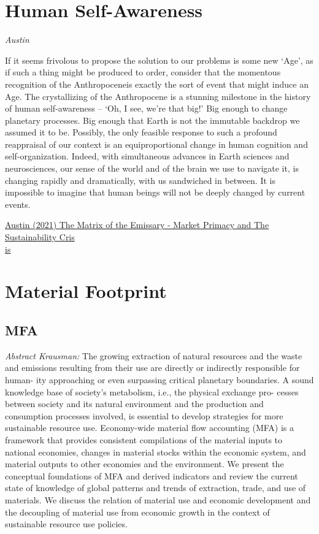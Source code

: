 \documentclass[
]{book}
\begin{document}
\hypertarget{human-self-awareness}{%
\section{Human Self-Awareness}\label{human-self-awareness}}

\emph{Austin}

If it seems frivolous to propose the solution to our problems is some new `Age', as if such a thing might be produced to order, consider that the momentous recognition of the Anthropoceneis exactly the sort of event that might induce an Age. The crystallizing of the Anthropocene is a stunning milestone in the history of human self-awareness -- `Oh, I see, we're that big!' Big enough to change planetary processes. Big enough that Earth is not the immutable backdrop we assumed it to be. Possibly, the only feasible response to such a profound reappraisal of our context is an equiproportional change in human cognition and self-organization. Indeed, with simultaneous advances in Earth sciences and neurosciences, our sense of the world and of the brain we use to navigate it, is changing rapidly and dramatically, with us sandwiched in between. It is impossible to imagine that human beings will not be deeply changed by current events.

\href{https://channelmcgilchrist.com/articles/the-matrix-of-the-emissary/}{Austin (2021) The Matrix of the Emissary - Market Primacy and The Sustainability Cris\\
is}

\hypertarget{material-footprint}{%
\section{Material Footprint}\label{material-footprint}}

\hypertarget{mfa}{%
\subsection{MFA}\label{mfa}}

\emph{Abstract Krausman:}
The growing extraction of natural resources and the waste and emissions
resulting from their use are directly or indirectly responsible for human-
ity approaching or even surpassing critical planetary boundaries. A sound
knowledge base of society's metabolism, i.e., the physical exchange pro-
cesses between society and its natural environment and the production and
consumption processes involved, is essential to develop strategies for more
sustainable resource use. Economy-wide material flow accounting (MFA) is
a framework that provides consistent compilations of the material inputs to
national economies, changes in material stocks within the economic system,
and material outputs to other economies and the environment. We present
the conceptual foundations of MFA and derived indicators and review the
current state of knowledge of global patterns and trends of extraction, trade,
and use of materials. We discuss the relation of material use and economic
development and the decoupling of material use from economic growth in
the context of sustainable resource use policies.
\end{document}
